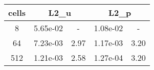 \documentclass[10pt]{report}
\begin{document}
\begin{table}[H]
\begin{center}
\begin{tabular}{|c|c|c|c|c|} \hline
cells & 
\multicolumn{2}{|c|}{L2_u} & 
\multicolumn{2}{|c|}{L2_p}\\ \hline
8 & 5.65e-02 & - & 1.08e-02 & -\\ \hline
64 & 7.23e-03 & 2.97 & 1.17e-03 & 3.20\\ \hline
512 & 1.21e-03 & 2.58 & 1.27e-04 & 3.20\\ \hline
\end{tabular}
\end{center}
\end{table}
\end{document}

